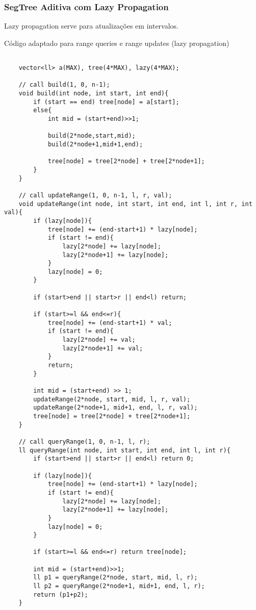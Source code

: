 \subsubsection{SegTree Aditiva com Lazy Propagation}
\par Lazy propagation serve para atualizações em intervalos.
\par Código adaptado para range queries e range updates (lazy propagation)
\begin{verbatim}

    vector<ll> a(MAX), tree(4*MAX), lazy(4*MAX);

    // call build(1, 0, n-1);
    void build(int node, int start, int end){
        if (start == end) tree[node] = a[start];
        else{
            int mid = (start+end)>>1;
    
            build(2*node,start,mid);
            build(2*node+1,mid+1,end);
    
            tree[node] = tree[2*node] + tree[2*node+1];
        }
    }

    // call updateRange(1, 0, n-1, l, r, val);
    void updateRange(int node, int start, int end, int l, int r, int val){
        if (lazy[node]){
            tree[node] += (end-start+1) * lazy[node];
            if (start != end){
                lazy[2*node] += lazy[node];
                lazy[2*node+1] += lazy[node];
            }
            lazy[node] = 0;
        }
    
        if (start>end || start>r || end<l) return;
    
        if (start>=l && end<=r){
            tree[node] += (end-start+1) * val;
            if (start != end){
                lazy[2*node] += val;
                lazy[2*node+1] += val;
            }
            return;
        }
    
        int mid = (start+end) >> 1;
        updateRange(2*node, start, mid, l, r, val);
        updateRange(2*node+1, mid+1, end, l, r, val);
        tree[node] = tree[2*node] + tree[2*node+1];
    }

    // call queryRange(1, 0, n-1, l, r);
    ll queryRange(int node, int start, int end, int l, int r){
        if (start>end || start>r || end<l) return 0;
    
        if (lazy[node]){
            tree[node] += (end-start+1) * lazy[node];
            if (start != end){
                lazy[2*node] += lazy[node];
                lazy[2*node+1] += lazy[node];
            }
            lazy[node] = 0;
        }
    
        if (start>=l && end<=r) return tree[node];
    
        int mid = (start+end)>>1;
        ll p1 = queryRange(2*node, start, mid, l, r);
        ll p2 = queryRange(2*node+1, mid+1, end, l, r);
        return (p1+p2);
    }
\end{verbatim}
